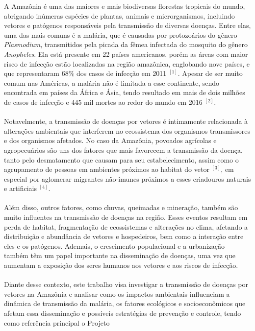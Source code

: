 \documentclass[12pt]{article}
\begin{document}
A Amazônia é uma das maiores e mais biodiversas florestas tropicais do mundo, 
abrigando inúmeras espécies de plantas, animais e microrganismos, incluindo 
vetores e patógenos responsáveis pela transmissão de diversas doenças. Entre 
elas, uma das mais comuns é a malária, que é causadas por protozoários do 
gênero \textit{Plasmodium}, transmitidos pela picada da fêmea infectada do 
mosquito do gênero \textit{Anopheles}. Ela está presente em 22 países 
americanos, porém as áreas com maior risco de infecção estão localizadas 
na região amazônica, englobando nove países, e que representaram $68\%$ 
dos casos de infecção em 2011 $^{[1]}$. Apesar de ser muito comum nas 
Américas, a malária não é limitada a esse continente, sendo encontrada 
em países da África e Ásia, tendo resultado em mais de dois milhões de 
casos de infecção e  445 mil mortes ao redor do mundo em 2016 $^{[2]}$.    
\\\\
Notavelmente, a transmissão de doenças por vetores é intimamente relacionada 
à alterações ambientais que interferem no ecossistema dos organismos 
transmissores e dos organismos afetados. No caso da Amazônia, povoados 
agrícolas e agropecuários são uns dos fatores que mais favorecem a 
transmissão da doença, tanto pelo desmatamento que causam para seu 
estabelecimento, assim como o agrupamento de pessoas em ambientes 
próximos ao habitat do vetor $^{[3]}$, em especial por aglomerar migrantes 
não-imunes próximos a esses criadouros naturais e artificiais $^{[4]}$. 
\\\\
Além disso, outros fatores, 
como chuvas, queimadas e mineração, também são muito influentes na 
transmissão de doenças na região. Esses eventos resultam em perda 
de habitat, fragmentação de ecossistemas e alterações no clima, 
afetando a distribuição e abundância de vetores e hospedeiros, bem 
como a interação entre eles e os patógenos. Ademais, o crescimento 
populacional e a urbanização também têm um papel importante na disseminação 
de doenças, uma vez que aumentam a exposição dos seres humanos aos vetores 
e aos riscos de infecção.
\\\\
Diante desse contexto, este trabalho visa investigar a transmissão de 
doenças por vetores na Amazônia e analisar como os impactos ambientais 
influenciam a dinâmica de transmissão da malária, os fatores ecológicos 
e socioeconômicos que afetam essa disseminação e possíveis estratégias 
de prevenção e controle, tendo como referência principal o Projeto 
\end{document}
